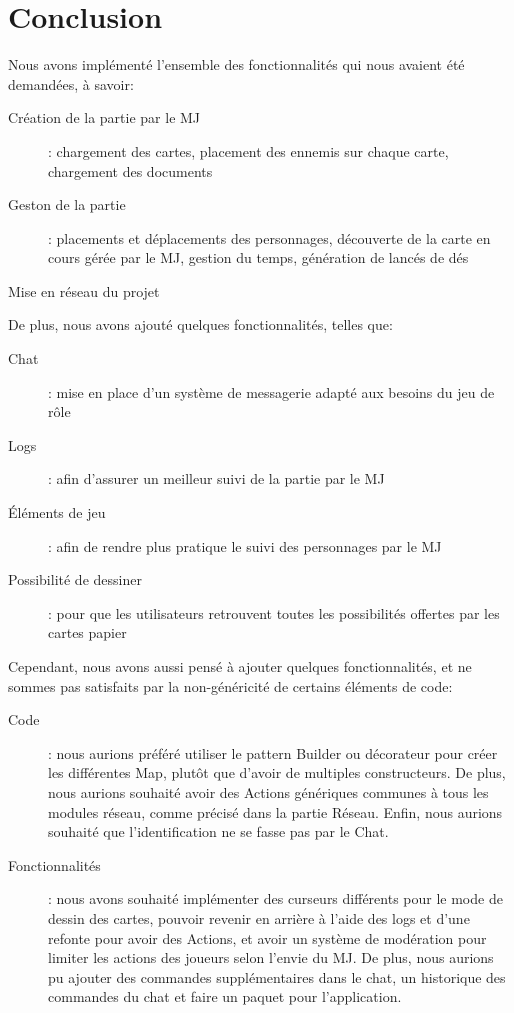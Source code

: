 \section{Conclusion}

Nous avons implémenté l'ensemble des fonctionnalités qui nous avaient été demandées, à savoir:
\begin{description}
	\item[Création de la partie par le MJ]: chargement des cartes, placement des ennemis sur chaque carte, chargement des documents
	\item[Geston de la partie]: placements et déplacements des personnages, découverte de la carte en cours gérée par le MJ, gestion du temps, génération de lancés de dés
	\item[Mise en réseau du projet]
\end{description}
\hfill

De plus, nous avons ajouté quelques fonctionnalités, telles que:
\begin{description}
	\item[Chat]: mise en place d'un système de messagerie adapté aux besoins du jeu de rôle
	\item[Logs]: afin d'assurer un meilleur suivi de la partie par le MJ
	\item[Éléments de jeu]: afin de rendre plus pratique le suivi des personnages par le MJ
	\item[Possibilité de dessiner]: pour que les utilisateurs retrouvent toutes les possibilités offertes par les cartes papier
\end{description}
\hfill

Cependant, nous avons aussi pensé à ajouter quelques fonctionnalités, et ne sommes pas satisfaits par la non-généricité de certains éléments de code:
\begin{description}
	\item[Code]: nous aurions préféré utiliser le pattern Builder ou décorateur pour créer les différentes Map, plutôt que d'avoir de multiples constructeurs. De plus, nous aurions souhaité avoir des Actions génériques communes à tous les modules réseau, comme précisé dans la partie Réseau. Enfin, nous aurions souhaité que l'identification ne se fasse pas par le Chat.
	\item[Fonctionnalités]: nous avons souhaité implémenter des curseurs différents pour le mode de dessin des cartes, pouvoir revenir en arrière à l'aide des logs et d'une refonte pour avoir des Actions, et avoir un système de modération pour limiter les actions des joueurs selon l'envie du MJ. De plus, nous aurions pu ajouter des commandes supplémentaires dans le chat, un historique des commandes du chat et faire un paquet pour l'application.
\end{description}